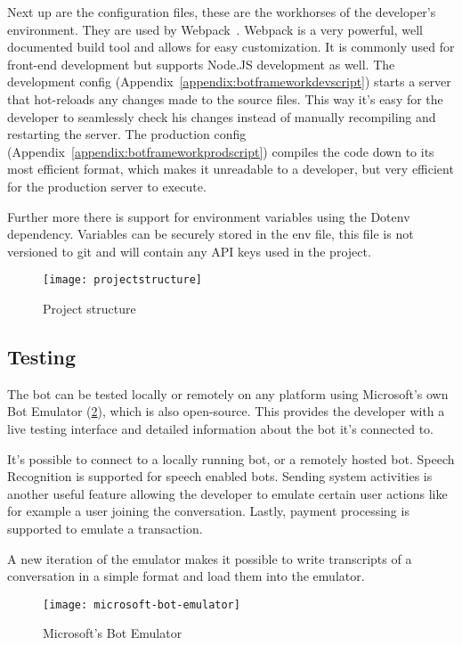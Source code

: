 Next up are the configuration files, these are the workhorses of the developer's environment. They are used by Webpack~\cite{webpack}. Webpack is a very powerful, well documented build tool and allows for easy customization. It is commonly used for front-end development but supports Node.JS development as well. The development config (Appendix~\ref{appendix:botframeworkdevscript}) starts a server that hot-reloads any changes made to the source files. This way it's easy for the developer to seamlessly check his changes instead of manually recompiling and restarting the server. The production config (Appendix~\ref{appendix:botframeworkprodscript}) compiles the code down to its most efficient format, which makes it unreadable to a developer, but very efficient for the production server to execute.

Further more there is support for environment variables using the Dotenv~\cite{dotenv} dependency. Variables can be securely stored in the env file, this file is not versioned to git and will contain any API keys used in the project.

\begin{figure}[ht]
	\centering
	\texttt{[image: projectstructure]}
	\caption{Project structure}
	\label{fig:projectstructure}
\end{figure}

\subsection{Testing}

The bot can be tested locally or remotely on any platform using Microsoft's own Bot Emulator (\ref{fig:microsoft-bot-emulator}), which is also open-source. This provides the developer with a live testing interface and detailed information about the bot it's connected to.

It's possible to connect to a locally running bot, or a remotely hosted bot. Speech Recognition is supported for speech enabled bots. Sending system activities is another useful feature allowing the developer to emulate certain user actions like for example a user joining the conversation. Lastly, payment processing is supported to emulate a transaction.

A new iteration of the emulator makes it possible to write transcripts of a conversation in a simple format and load them into the emulator.

\begin{figure}[ht]
	\centering
	\texttt{[image: microsoft-bot-emulator]}
	\caption{Microsoft's Bot Emulator~\cite{microsoft-bot-emulator}}
	\label{fig:microsoft-bot-emulator}
\end{figure}


